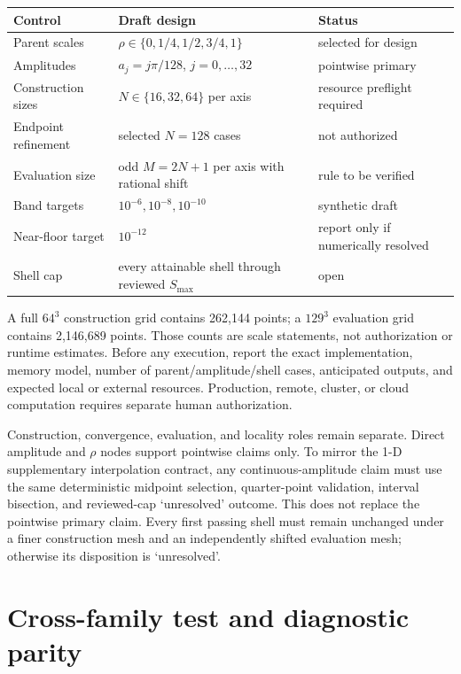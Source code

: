 \documentclass[11pt]{article}
\begin{document}
\begin{table}[htbp]
\centering
\begin{tabular}{>{\raggedright\arraybackslash}p{}
                  >{\raggedright\arraybackslash}p{}
                  >{\raggedright\arraybackslash}p{}}
\toprule
Control & Draft design & Status\\
\midrule
Parent scales & $\rho\in\{0,1/4,1/2,3/4,1\}$ & selected for design\\
Amplitudes & $a_j=j\pi/128$, $j=0,\ldots,32$ & pointwise primary\\
Construction sizes & $N\in\{16,32,64\}$ per axis & resource preflight required\\
Endpoint refinement & selected $N=128$ cases & not authorized\\
Evaluation size & odd $M=2N+1$ per axis with rational shift & rule to be verified\\
Band targets & $10^{-6},10^{-8},10^{-10}$ & synthetic draft\\
Near-floor target & $10^{-12}$ & report only if numerically resolved\\
Shell cap & every attainable shell through reviewed $S_{\max}$ & open\\
\bottomrule
\end{tabular}
\end{table}

A full $64^3$ construction grid contains 262,144 points; a $129^3$ evaluation grid
contains 2,146,689 points. Those counts are scale statements, not authorization or
runtime estimates. Before any execution, report the exact implementation, memory model,
number of parent/amplitude/shell cases, anticipated outputs, and expected local or
external resources. Production, remote, cluster, or cloud computation requires separate
human authorization.

Construction, convergence, evaluation, and locality roles remain separate. Direct
amplitude and $\rho$ nodes support pointwise claims only. To mirror the 1-D supplementary
interpolation contract, any continuous-amplitude claim must use the same deterministic
midpoint selection, quarter-point validation, interval bisection, and reviewed-cap
`unresolved' outcome. This does not replace the pointwise primary claim. Every first passing shell must
remain unchanged under a finer construction mesh and an independently shifted
evaluation mesh; otherwise its disposition is `unresolved'.

\section{Cross-family test and diagnostic parity}
\end{document}
